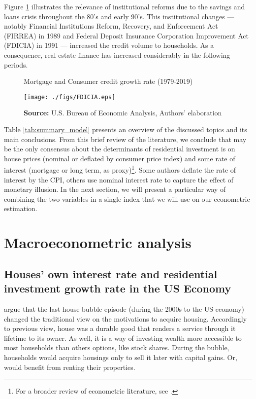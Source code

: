 \documentclass[12pt, a4paper]{article}
\begin{document}
Figure \ref{Fig:CreditFDICIA} illustrates the relevance of institutional reforms due to the savings and loans crisis throughout the 80's and early 90's.
This institutional changes --- notably Financial Institutions Reform, Recovery, and Enforcement Act (FIRREA) in 1989 and Federal Deposit Insurance Corporation Improvement Act  (FDICIA) in 1991 --- increased the credit volume to households.
As a consequence, real estate finance has increased considerably in the following periods.


\begin{figure}[htb]
	\centering
	\caption{Mortgage and Consumer credit growth rate (1979-2019)}
	\label{Fig:CreditFDICIA}
	\texttt{[image: ./figs/FDICIA.eps]}
	\caption*{\textbf{Source:} U.S. Bureau of Economic Analysis, Authors' elaboration}
\end{figure}

Table \ref{tab:summary_model} presents an overview of the discussed topics and its main conclusions.
From this brief review of the literature, we conclude that may be the only consensus about the determinants of residential investment is on house prices (nominal or deflated by consumer price index) and some rate of interest (mortgage or long term, as proxy)\footnote{For a broader review of econometric literature, see \textcite{egebo_1990_MODEL}.}.
Some authors deflate the rate of interest by the CPI, others use nominal interest rate to capture the effect of monetary illusion.
In the next section, we will present a particular way of combining the two variables in a single index that we will use on our econometric estimation.




\section{Macroeconometric analysis}
\label{sec:org8195bd7}
\label{sec:VECM}
\subsection{Houses' own interest rate and residential investment growth rate in the US	Economy}
\label{sec:orgaa41483}
\label{sc:own}


\textcite{arestis_residential_2015} argue that the last house bubble episode (during the 2000s to the US economy) changed the traditional view on the motivations to acquire housing.
Accordingly to previous view, house was a durable good that renders a service through it lifetime to its owner.
As well, it is a way of investing wealth more accessible to most households than others options, like stock shares.
During the bubble, households would acquire housings only to sell it later with capital gains.
Or, would benefit from renting their properties.
\end{document}
